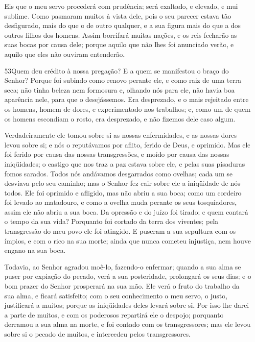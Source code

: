 Eis que o meu servo procederá com prudência; será exaltado, e
elevado, e mui sublime. Como pasmaram muitos à vista dele,
pois o seu parecer estava tão desfigurado, mais do que o de outro
qualquer, e a sua figura mais do que a dos outros filhos dos homens.
Assim borrifará muitas nações, e os reis fecharão as suas
bocas por causa dele; porque aquilo que não lhes foi anunciado
verão, e aquilo que eles não ouviram entenderão.

\medskip

\lettrine{53}{}Quem deu crédito à nossa pregação? E a quem se
manifestou o braço do Senhor? Porque foi subindo como renovo
perante ele, e como raiz de uma terra seca; não tinha beleza nem
formosura e, olhando nós para ele, não havia boa aparência nele,
para que o desejássemos. Era desprezado, e o mais rejeitado
entre os homens, homem de dores, e experimentado nos trabalhos; e,
como um de quem os homens escondiam o rosto, era desprezado, e não
fizemos dele caso algum.

Verdadeiramente ele tomou sobre si as nossas enfermidades, e as
nossas dores levou sobre si; e nós o reputávamos por aflito, ferido
de Deus, e oprimido. Mas ele foi ferido por causa das nossas
transgressões, e moído por causa das nossas iniqüidades; o castigo
que nos traz a paz estava sobre ele, e pelas suas pisaduras fomos
sarados. Todos nós andávamos desgarrados como ovelhas; cada um
se desviava pelo seu caminho; mas o Senhor fez cair sobre ele a
iniqüidade de nós todos. Ele foi oprimido e afligido, mas não
abriu a sua boca; como um cordeiro foi levado ao matadouro, e como a
ovelha muda perante os seus tosquiadores, assim ele não abriu a sua
boca. Da opressão e do juízo foi tirado; e quem contará o tempo
da sua vida? Porquanto foi cortado da terra dos viventes; pela
transgressão do meu povo ele foi atingido. E puseram a sua
sepultura com os ímpios, e com o rico na sua morte; ainda que nunca
cometeu injustiça, nem houve engano na sua boca.

Todavia, ao Senhor agradou moê-lo, fazendo-o enfermar; quando a
sua alma se puser por expiação do pecado, verá a sua posteridade,
prolongará os seus dias; e o bom prazer do Senhor prosperará na sua
mão. Ele verá o fruto do trabalho da sua alma, e ficará
satisfeito; com o seu conhecimento o meu servo, o justo, justificará
a muitos; porque as iniqüidades deles levará sobre si. Por
isso lhe darei a parte de muitos, e com os poderosos repartirá ele o
despojo; porquanto derramou a sua alma na morte, e foi contado com
os transgressores; mas ele levou sobre si o pecado de muitos, e
intercedeu pelos transgressores.

